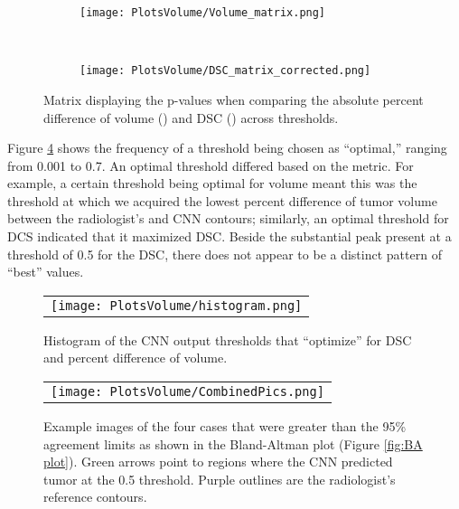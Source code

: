 \documentclass{article}
\begin{document}
\begin{figure}[H]
    \centering
    \begin{subfigure}[t]{0.5\textwidth}
        \centering        
        \texttt{[image: PlotsVolume/Volume\_matrix.png]}
        \caption{}
        \label{subfig:p-value volume}
    \end{subfigure}%
    ~ 
    \begin{subfigure}[t]{0.5\textwidth}
        \centering        
        \texttt{[image: PlotsVolume/DSC\_matrix\_corrected.png]}
        \caption{}
        \label{subfig:p-value Dice}
    \end{subfigure}
    \caption{Matrix displaying the p-values when comparing the absolute percent difference of volume () and DSC () across thresholds.}
    \label{fig:matrices}
\end{figure} 
Figure \ref{fig:histogram} shows the frequency of a threshold being chosen as ``optimal,'' ranging from 0.001 to 0.7. An optimal threshold differed based on the metric. For example, a certain threshold being optimal for volume meant this was the threshold at which we acquired the lowest percent difference of tumor volume between the radiologist’s and CNN contours; similarly, an optimal threshold for DCS indicated that it maximized DSC. Beside the substantial peak present at a threshold of 0.5 for the DSC, there does not appear to be a distinct pattern of ``best'' values.

\begin{figure} [H]
   \begin{center}
   \begin{tabular}{c}
   \texttt{[image: PlotsVolume/histogram.png]}
   \end{tabular}
   \end{center}
   \caption{Histogram of the CNN output thresholds that ``optimize'' for DSC and percent difference of volume.}
   \label{fig:histogram}
\end{figure} 

\begin{figure} [h!]
   \begin{center}
   \begin{tabular}{c}
   \texttt{[image: PlotsVolume/CombinedPics.png]}
   \end{tabular}
   \end{center}
   \caption{Example images of the four cases that were greater than the 95\% agreement limits as shown in the Bland-Altman plot (Figure \ref{fig:BA plot}). Green arrows point to regions where the CNN predicted tumor at the 0.5 threshold. Purple outlines are the radiologist’s reference contours.}
   \label{fig:combinedpics}
\end{figure} 
\end{document}
